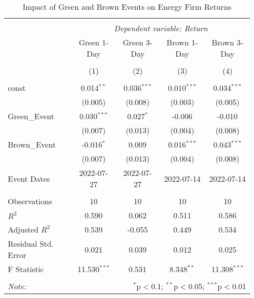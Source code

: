 \begin{table}[!htbp] \centering
  \caption{Impact of Green and Brown Events on Energy Firm Returns}
\begin{tabular}{@{\extracolsep{5pt}}lcccc}
\\[-1.8ex]\hline
\hline \\[-1.8ex]
& \multicolumn{4}{c}{\textit{Dependent variable: Return}} \
\cr \cline{2-5}
\\[-1.8ex] & \multicolumn{1}{c}{Green 1-Day} & \multicolumn{1}{c}{Green 3-Day} & \multicolumn{1}{c}{Brown 1-Day} & \multicolumn{1}{c}{Brown 3-Day}  \\
\\[-1.8ex] & (1) & (2) & (3) & (4) \\
\hline \\[-1.8ex]
 const & 0.014$^{**}$ & 0.036$^{***}$ & 0.010$^{***}$ & 0.034$^{***}$ \\
& (0.005) & (0.008) & (0.003) & (0.005) \\
 Green_Event & 0.030$^{***}$ & 0.027$^{*}$ & -0.006$^{}$ & -0.010$^{}$ \\
& (0.007) & (0.013) & (0.004) & (0.008) \\
 Brown_Event & -0.016$^{*}$ & 0.009$^{}$ & 0.016$^{***}$ & 0.043$^{***}$ \\
& (0.007) & (0.013) & (0.004) & (0.008) \\
 Event Dates & 2022-07-27 & 2022-07-27 & 2022-07-14 & 2022-07-14 \\
\hline \\[-1.8ex]
 Observations & 10 & 10 & 10 & 10 \\
 $R^2$ & 0.590 & 0.062 & 0.511 & 0.586 \\
 Adjusted $R^2$ & 0.539 & -0.055 & 0.449 & 0.534 \\
 Residual Std. Error & 0.021 & 0.039 & 0.012 & 0.025 \\
 F Statistic & 11.530$^{***}$ & 0.531$^{}$ & 8.348$^{**}$ & 11.308$^{***}$ \\
\hline
\hline \\[-1.8ex]
\textit{Note:} & \multicolumn{4}{r}{$^{*}$p$<$0.1; $^{**}$p$<$0.05; $^{***}$p$<$0.01} \\
\end{tabular}
\end{table}